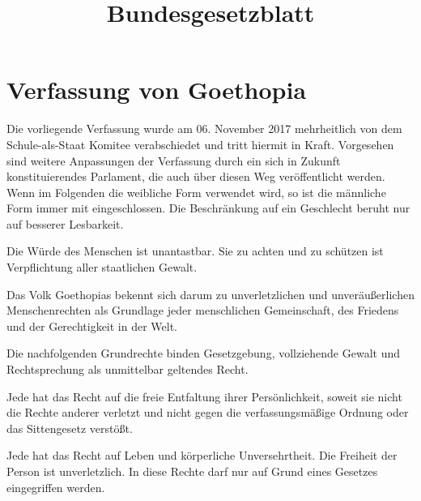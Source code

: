 \documentclass{sasbase}
\begin{document}
\title{Bundesgesetzblatt}

\setcounter{secnumdepth}{5}

\mytitle

\parensstyle

\section{Verfassung von Goethopia}


Die vorliegende Verfassung wurde am 06. November 2017 mehrheitlich von dem Schule-als-Staat Komitee verabschiedet und tritt hiermit in Kraft. Vorgesehen sind weitere Anpassungen der Verfassung durch ein sich in Zukunft konstituierendes Parlament, die auch \"{u}ber diesen Weg ver\"{o}ffentlicht werden.\\
\indent Wenn im Folgenden die weibliche Form verwendet wird, so ist die männliche Form immer mit eingeschlossen. Die Beschränkung auf ein Geschlecht beruht nur auf besserer Lesbarkeit.


\begin{article}
	\item Die Würde des Menschen ist unantastbar. Sie zu achten und zu schützen ist Verpflichtung aller staatlichen Gewalt.
 	\item Das Volk Goethopias bekennt sich darum zu unverletzlichen und unveräußerlichen Menschenrechten als Grundlage jeder menschlichen Gemeinschaft, des Friedens und der Gerechtigkeit in der Welt.
	\item Die nachfolgenden Grundrechte binden Gesetzgebung, vollziehende Gewalt und Rechtsprechung als unmittelbar geltendes Recht.
\end{article}

\begin{article}
	\item Jede hat das Recht auf die freie Entfaltung ihrer Persönlichkeit, soweit sie nicht die Rechte anderer verletzt und nicht gegen die verfassungsmäßige Ordnung oder das Sittengesetz verstößt.	
	\item Jede hat das Recht auf Leben und körperliche Unversehrtheit. Die Freiheit der Person ist unverletzlich. In diese Rechte darf nur auf Grund eines Gesetzes eingegriffen werden.
\end{article}
\end{document}
